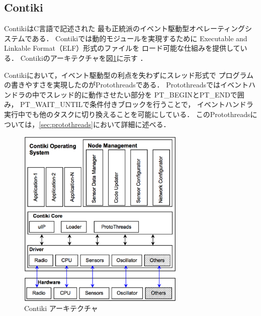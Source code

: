 \subsection{Contiki}
Contiki\cite{Dunkels:2004:CLF:1032658.1034117}はC言語で記述された
最も正統派のイベント駆動型オペレーティングシステムである．
Contikiでは動的モジュールを実現するために
Executable and Linkable Format（ELF）形式のファイルを
ロード可能な仕組みを提供している\cite{Dunkels06run-timedynamic}．
Contikiのアーキテクチャを図\ref{fig:system_conf_of_contiki}に示す
\cite{Dwivedi_operatingsystems}．



Contikiにおいて，イベント駆動型の利点を失わずにスレッド形式で
プログラムの書きやすさを実現したのがProtothreads\cite{Dunkels:2006:PSE:1182807.1182811}である．
Protothreadsではイベントハンドラの中でスレッド的に動作させたい部分を
PT\_BEGINとPT\_ENDで囲み，
PT\_WAIT\_UNTILで条件付きブロックを行うことで，
イベントハンドラ実行中でも他のタスクに切り換えることを可能にしている．
このProtothreadsについては，\ref{sec:protothreads}において詳細に述べる．


\begin{figure}[htbp]
 \begin{center}
  \includegraphics[width=80mm]{./images/system_conf_of_contiki.eps}
 \end{center}
 \caption{Contiki アーキテクチャ}
 \label{fig:system_conf_of_contiki}
\end{figure}




